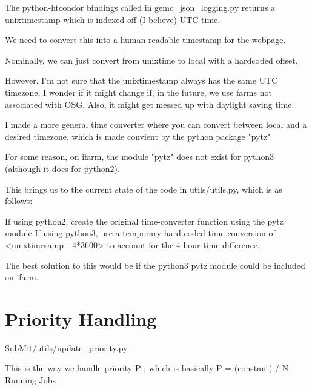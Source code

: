 The python-htcondor bindings called in gemc_json_logging.py returns a unixtimestamp which is indexed off (I believe) UTC time. 

We need to convert this into a human readable timestamp for the webpage.

Nominally, we can just convert from unixtime to local with a hardcoded offset.

However, I'm not sure that the unixtimestamp always has the same UTC timezone, I wonder if it might change if, in the future, we use farms not associated with OSG.
Also, it might get messed up with daylight saving time.

I made a more general time converter where you can convert between local and a desired timezone, which is made convient by the python package "pytz"

For some reason, on ifarm, the module "pytz" does not exist for python3 (although it does for python2). 

This brings us to the current state of the code in utils/utils.py, which is as follows:

If using python2, create the original time-converter function using the pytz module
If using python3, use a temporary hard-coded time-conversion of <unixtimesamp - 4*3600> to account for the 4 hour time difference.

The best solution to this would be if the python3 pytz module could be included on ifarm.


\section{Priority Handling}


       SubMit/utils/update\_priority.py
    
       This is the way we handle priority P , which is basically P =  (constant) / N Running Jobs
    